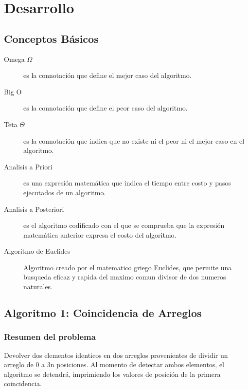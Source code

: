 \chapter{Desarrollo}

\section{Conceptos Básicos}
\begin{description}
    \item [Omega $\Omega$] es la connotación que define el mejor caso del algoritmo. 
    \item [Big O ] es la connotación que define el peor caso del algoritmo.
    \item [Teta $\Theta$] es la connotación que indica que no existe ni el peor ni el mejor caso en el algoritmo.
    \item [Analisis a Priori] es una expresión matemática que indica el tiempo entre costo y pasos ejecutados de un algoritmo.
    \item [Analisis a Posteriori] es el algoritmo codificado con el que se comprueba que la expresión matemática anterior expresa el costo del algoritmo.
    \item [Algoritmo de Euclides] Algoritmo creado por el matematico griego Euclides, que permite una busqueda eficaz y rapida del maximo comun divisor de dos numeros naturales. \cite{Euclides}
\end{description}

\section{Algoritmo 1: Coincidencia de Arreglos}
    \subsection{Resumen del problema}
        Devolver dos elementos identicos en dos arreglos provenientes de dividir un arreglo de 0 a 3n posiciones. Al momento de detectar ambos elementos, el algoritmo se detendrá, imprimiendo los valores de posición de la primera coincidencia.
    \newpage

